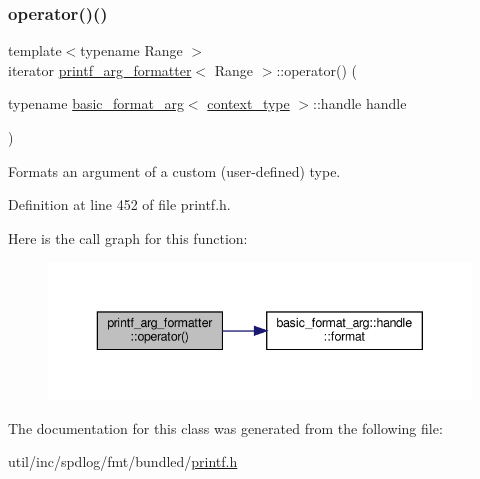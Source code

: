 \subsubsection{\texorpdfstring{operator()()}{operator()()}\hspace{0.1cm}{\footnotesize\ttfamily [8/8]}}
{\footnotesize\ttfamily template$<$typename Range $>$ \\
iterator \hyperlink{classprintf__arg__formatter}{printf\+\_\+arg\+\_\+formatter}$<$ Range $>$\+::operator() (\begin{DoxyParamCaption}\item[{typename \hyperlink{classbasic__format__arg}{basic\+\_\+format\+\_\+arg}$<$ \hyperlink{classbasic__printf__context}{context\+\_\+type} $>$\+::handle}]{handle }\end{DoxyParamCaption})\hspace{0.3cm}{\ttfamily [inline]}}

Formats an argument of a custom (user-\/defined) type. 

Definition at line 452 of file printf.\+h.

Here is the call graph for this function\+:
\nopagebreak
\begin{figure}[H]
\begin{center}
\leavevmode
\includegraphics[width=343pt]{classprintf__arg__formatter_a57ded50a248eab9775966e05330dfcb5_cgraph}
\end{center}
\end{figure}


The documentation for this class was generated from the following file\+:\begin{DoxyCompactItemize}
\item 
util/inc/spdlog/fmt/bundled/\hyperlink{printf_8h}{printf.\+h}\end{DoxyCompactItemize}
